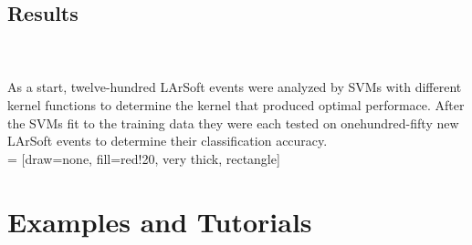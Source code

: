 \documentclass[svgnames]{report}
\begin{document}
    \section*{Results}
         \\ \\
        \indent As a start, twelve-hundred LArSoft events were analyzed by SVMs with different kernel functions to determine the kernel that produced optimal performace. After the SVMs fit to the training data they were each tested on onehundred-fifty new LArSoft events to determine their classification accuracy. \\
         = [draw=none, fill=red!20, very thick,
            rectangle]




















\chapter*{Examples and Tutorials}
\end{document}
